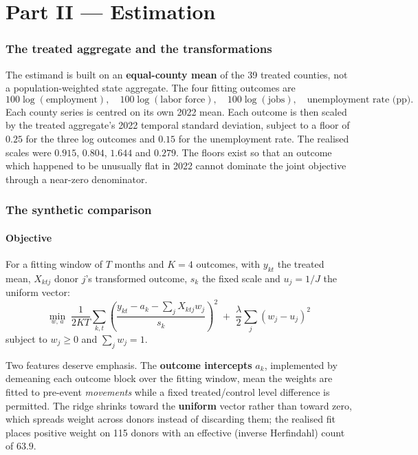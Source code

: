\documentclass[11pt,a4paper]{article}
\begin{document}
\part*{Part II --- Estimation}

\section{The treated aggregate and the transformations}

The estimand is built on an \textbf{equal-county mean} of the 39 treated
counties, not a population-weighted state aggregate. The four fitting outcomes
are
\[
100\log(\text{employment}),\quad 100\log(\text{labor force}),\quad
100\log(\text{jobs}),\quad \text{unemployment rate (pp)} .
\]
Each county series is centred on its own 2022 mean. Each outcome is then scaled
by the treated aggregate's 2022 temporal standard deviation, subject to a floor
of $0.25$ for the three log outcomes and $0.15$ for the unemployment rate. The
realised scales were $0.915$, $0.804$, $1.644$ and $0.279$. The floors exist so
that an outcome which happened to be unusually flat in 2022 cannot dominate the
joint objective through a near-zero denominator.

\section{The synthetic comparison}

\subsection{Objective}

For a fitting window of $T$ months and $K=4$ outcomes, with $y_{kt}$ the
treated mean, $X_{ktj}$ donor $j$'s transformed outcome, $s_k$ the fixed scale
and $u_j = 1/J$ the uniform vector:
\[
\min_{w,\,a}\;
\frac{1}{2KT}\sum_{k,t}\left(\frac{y_{kt}-a_k-\sum_j X_{ktj}w_j}{s_k}\right)^{\!2}
\;+\;\frac{\lambda}{2}\sum_j\left(w_j-u_j\right)^2
\]
subject to $w_j\ge 0$ and $\sum_j w_j = 1$.

Two features deserve emphasis. The \textbf{outcome intercepts} $a_k$,
implemented by demeaning each outcome block over the fitting window, mean the
weights are fitted to pre-event \emph{movements} while a fixed treated/control
level difference is permitted. The ridge shrinks toward the \textbf{uniform}
vector rather than toward zero, which spreads weight across donors instead of
discarding them; the realised fit places positive weight on 115 donors with an
effective (inverse Herfindahl) count of $63.9$.
\end{document}
